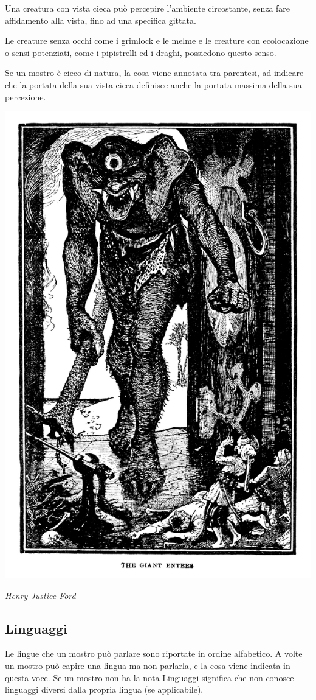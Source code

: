 \begin{multicols}{2}
Una creatura con vista cieca può percepire l'ambiente circostante, senza fare affidamento alla vista, fino ad una specifica gittata.

Le creature senza occhi come i grimlock e le melme e le creature con ecolocazione o sensi potenziati, come i pipistrelli ed i draghi, possiedono questo senso.

Se un mostro è cieco di natura, la cosa viene annotata tra parentesi, ad indicare che la portata della sua vista cieca definisce anche la portata massima della sua percezione.

\begin{center}
\includegraphics[width=0.65\linewidth]{immagini/ciclope.png}

\textit{Henry Justice Ford}
\end{center}

\subsection{Linguaggi}

Le lingue che un mostro può parlare sono riportate in ordine alfabetico. A volte un mostro può capire una lingua ma non parlarla, e la cosa viene indicata in questa voce. Se un mostro non ha la nota Linguaggi significa che non conosce linguaggi diversi dalla propria lingua (se applicabile).


\end{multicols}
